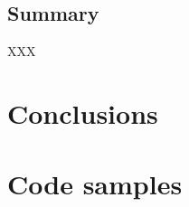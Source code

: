 \documentclass[11pt,chapterprefix=true,toc=bibliography,numbers=noendperiod,
               footnotes=multiple,twoside]{scrreprt}
\begin{document}

\section{Summary}

XXX

\chapter{Conclusions\label{ch:conclusions}}



\printbibliography


\appendix

\chapter{Code samples\label{ch:code-samples}}

%
%

\end{document}
